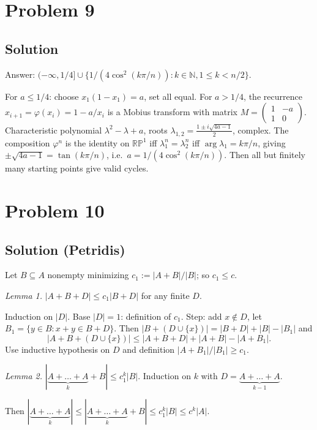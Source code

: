 \documentclass{article}
\begin{document}
\section*{Problem 9}
\subsection*{Solution}
Answer: $(-\infty, 1/4] \cup \{1/(4\cos^2(k\pi/n)) : k \in \mathbb{N}, 1 \le k < n/2\}$.

For $a \le 1/4$: choose $x_1(1-x_1) = a$, set all equal. For $a > 1/4$, the recurrence $x_{i+1} = \varphi(x_i) = 1 - a/x_i$ is a Mobius transform with matrix $M = \begin{pmatrix} 1 & -a \\ 1 & 0 \end{pmatrix}$. Characteristic polynomial $\lambda^2 - \lambda + a$, roots $\lambda_{1,2} = \frac{1 \pm i\sqrt{4a-1}}{2}$, complex. The composition $\varphi^n$ is the identity on $\mathbb{RP}^1$ iff $\lambda_1^n = \lambda_2^n$ iff $\arg\lambda_1 = k\pi/n$, giving $\pm\sqrt{4a-1} = \tan(k\pi/n)$, i.e.\ $a = 1/(4\cos^2(k\pi/n))$. Then all but finitely many starting points give valid cycles.

\section*{Problem 10}
\subsection*{Solution (Petridis)}
Let $B \subseteq A$ nonempty minimizing $c_1 := |A+B|/|B|$; so $c_1 \le c$.

\emph{Lemma 1.} $|A + B + D| \le c_1 |B + D|$ for any finite $D$.

Induction on $|D|$. Base $|D|=1$: definition of $c_1$. Step: add $x \notin D$, let $B_1 = \{y \in B : x+y \in B+D\}$. Then $|B + (D \cup \{x\})| = |B+D| + |B| - |B_1|$ and
\[ |A + B + (D \cup \{x\})| \le |A+B+D| + |A+B| - |A+B_1|. \]
Use inductive hypothesis on $D$ and definition $|A+B_1|/|B_1| \ge c_1$.

\emph{Lemma 2.} $|\underbrace{A + \dots + A}_k + B| \le c_1^k |B|$. Induction on $k$ with $D = \underbrace{A+\dots+A}_{k-1}$.

Then $|\underbrace{A+\dots+A}_k| \le |\underbrace{A+\dots+A}_k + B| \le c_1^k |B| \le c^k |A|$.
\end{document}
